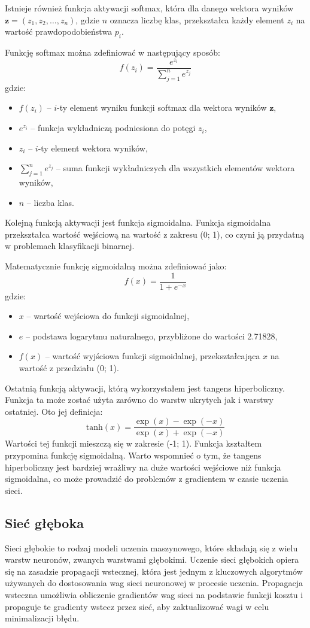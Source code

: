 \documentclass[a4paper]{article}
\begin{document}
Istnieje również funkcja aktywacji softmax, która dla danego wektora wyników \( \mathbf{z} = (z_1, z_2, \ldots, z_n) \), gdzie \( n \) oznacza liczbę klas, przekształca każdy element \( z_i \) na wartość prawdopodobieństwa \( p_i \).

Funkcję softmax można zdefiniować w następujący sposób:
\[
    f(z_i) = \frac{e^{z_i}}{\sum_{j=1}^{n} e^{z_j}}
\]
gdzie:
\begin{itemize}
    \item \(f(z_i)\) -- \(i\)-ty element wyniku funkcji softmax dla wektora wyników \(\mathbf{z}\),
    \item \(e^{z_i}\) -- funkcja wykładniczą podniesiona do potęgi \(z_i\),
    \item \(z_i\) -- \(i\)-ty element wektora wyników,
    \item \(\sum_{j=1}^{n} e^{z_j}\) -- suma funkcji wykładniczych dla wszystkich elementów wektora wyników,
    \item \(n\) -- liczba klas.
\end{itemize}

Kolejną funkcją aktywacji jest funkcja sigmoidalna.
Funkcja sigmoidalna przekształca wartość wejściową na wartość z zakresu (0; 1), co czyni ją przydatną w problemach klasyfikacji binarnej.

Matematycznie funkcję sigmoidalną można zdefiniować jako:
\[
    f(x) = \frac{1}{1 + e^{-x}}
\]
gdzie:
\begin{itemize}
    \item \(x\) -- wartość wejściowa do funkcji sigmoidalnej,
    \item \(e\) --  podstawa logarytmu naturalnego, przybliżone do wartości 2.71828,
    \item \(f(x)\) -- wartość wyjściowa funkcji sigmoidalnej, przekształcająca \(x\) na wartość z przedziału (0; 1).
\end{itemize}

Ostatnią funkcją aktywacji, którą wykorzystałem jest tangens hiperboliczny.
Funkcja ta może zostać użyta zarówno do warstw ukrytych jak i warstwy ostatniej.
Oto jej definicja:
\[\text{tanh}(x) = \frac{{\exp(x) - \exp(-x)}}{{\exp(x) + \exp(-x)}}\]
Wartości tej funkcji mieszczą się w zakresie (-1; 1).
Funkcja kształtem przypomina funkcję sigmoidalną.
Warto wspomnieć o tym, że tangens hiperboliczny jest bardziej wrażliwy na duże wartości wejściowe niż funkcja sigmoidalna, co może prowadzić do problemów z gradientem w czasie uczenia sieci.

\newpage
\subsection{Sieć głęboka}
Sieci głębokie to rodzaj modeli uczenia maszynowego, które składają się z wielu warstw neuronów, zwanych warstwami głębokimi.
Uczenie sieci głębokich opiera się na zasadzie propagacji wstecznej, która jest jednym z kluczowych algorytmów używanych do dostosowania wag sieci neuronowej w procesie uczenia.
Propagacja wsteczna umożliwia obliczenie gradientów wag sieci na podstawie funkcji kosztu i propaguje te gradienty wstecz przez sieć, aby zaktualizować wagi w celu minimalizacji błędu.
\end{document}
